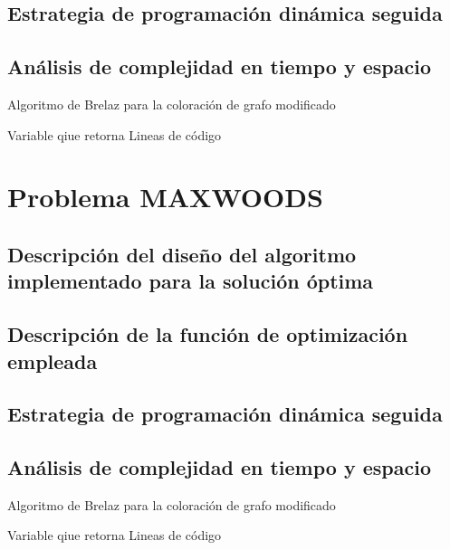 \documentclass[a4paper,10pt]{article}
\begin{document}
  \subsection{Estrategia de programación dinámica seguida}
  \hspace{2cm}

  \subsection{Análisis de complejidad en tiempo y espacio}
  \hspace{2cm}

  \begin{algorithm}                  
  \caption{Algoritmo de Brelaz para la coloración de grafo modificado}         
  \label{BORW}                 
  \begin{algorithmic}[1]                 
      \ENSURE Variable qiue retorna
      \STATE Lineas de código
  \end{algorithmic}
  \end{algorithm}


\section{Problema MAXWOODS}

  \subsection{Descripción del diseño del algoritmo implementado para la solución óptima}
  \hspace{2cm}

  \subsection{Descripción de la función de optimización empleada}
  \hspace{2cm}

  \subsection{Estrategia de programación dinámica seguida}
  \hspace{2cm}

  \subsection{Análisis de complejidad en tiempo y espacio}
  \hspace{2cm}

  \begin{algorithm}                  
  \caption{Algoritmo de Brelaz para la coloración de grafo modificado}         
  \label{MAXWOODS}                 
  \begin{algorithmic}[1]                 
      \ENSURE Variable qiue retorna
      \STATE Lineas de código
  \end{algorithmic}
  \end{algorithm}
  
\end{document}

